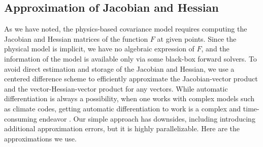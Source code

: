 \documentclass[article,ij4uq]{ij4uq}              %
\begin{document}
\subsection{Approximation of Jacobian and Hessian}\label{sec:ajh}
\par As we have noted, the physics-based covariance model requires computing the Jacobian and Hessian matrices of the function $F$ at given points. Since the physical model is implicit, we have no algebraic expression of $F$, and the information of the model is  available only via some black-box forward solvers. To avoid direct estimation and storage of the Jacobian and Hessian, we use a centered difference scheme to efficiently approximate the Jacobian-vector product and the vector-Hessian-vector product for any vectors. While automatic differentiation is always a possibility, when one works with complex models such as climate codes, getting automatic differentiation to work is a complex and time-consuming endeavor \cite{mametjanov2012applying}. Our simple approach has downsides, including  introducing additional approximation errors, but it is highly parallelizable. Here are the approximations we use. 
\end{document}

